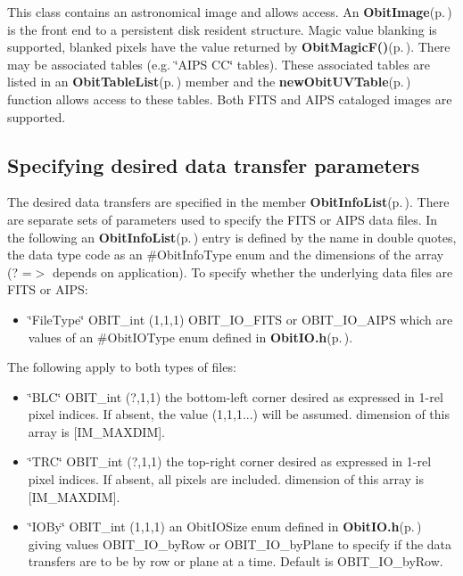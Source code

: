 This class contains an astronomical image and allows access. An {\bf Obit\-Image}{\rm (p.\,\pageref{structObitImage})} is the front end to a persistent disk resident structure. Magic value blanking is supported, blanked pixels have the value returned by {\bf Obit\-Magic\-F()}{\rm (p.\,\pageref{Obit_8h_a21})}. There may be associated tables (e.g. \char`\"{}AIPS CC\char`\"{} tables). These associated tables are listed in an {\bf Obit\-Table\-List}{\rm (p.\,\pageref{structObitTableList})} member and the {\bf new\-Obit\-UVTable}{\rm (p.\,\pageref{ObitUV_8c_a30})} function allows access to these tables. Both FITS and AIPS cataloged images are supported.\subsection{Specifying desired data transfer parameters}\label{ObitImage_8h_ObitImageSpecification}
The desired data transfers are specified in the member {\bf Obit\-Info\-List}{\rm (p.\,\pageref{structObitInfoList})}. There are separate sets of parameters used to specify the FITS or AIPS data files. In the following an {\bf Obit\-Info\-List}{\rm (p.\,\pageref{structObitInfoList})} entry is defined by the name in double quotes, the data type code as an \#Obit\-Info\-Type enum and the dimensions of the array (? =$>$ depends on application). To specify whether the underlying data files are FITS or AIPS: \begin{itemize}
\item \char`\"{}File\-Type\char`\"{} OBIT\_\-int (1,1,1) OBIT\_\-IO\_\-FITS or OBIT\_\-IO\_\-AIPS which are values of an \#Obit\-IOType enum defined in {\bf Obit\-IO.h}{\rm (p.\,\pageref{ObitIO_8h})}.\end{itemize}
The following apply to both types of files: \begin{itemize}
\item \char`\"{}BLC\char`\"{} OBIT\_\-int (?,1,1) the bottom-left corner desired as expressed in 1-rel pixel indices. If absent, the value (1,1,1...) will be assumed. dimension of this array is [IM\_\-MAXDIM]. \item \char`\"{}TRC\char`\"{} OBIT\_\-int (?,1,1) the top-right corner desired as expressed in 1-rel pixel indices. If absent, all pixels are included. dimension of this array is [IM\_\-MAXDIM]. \item \char`\"{}IOBy\char`\"{} OBIT\_\-int (1,1,1) an Obit\-IOSize enum defined in {\bf Obit\-IO.h}{\rm (p.\,\pageref{ObitIO_8h})} giving values OBIT\_\-IO\_\-by\-Row or OBIT\_\-IO\_\-by\-Plane to specify if the data transfers are to be by row or plane at a time. Default is OBIT\_\-IO\_\-by\-Row.\end{itemize}
